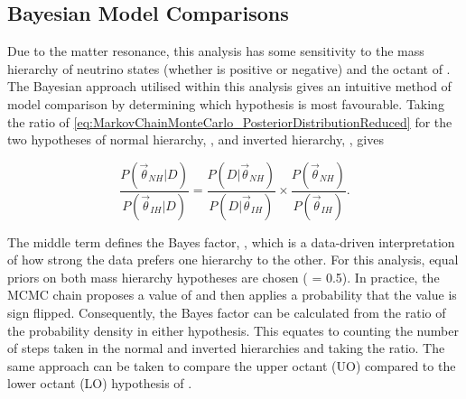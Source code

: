 \subsection{Bayesian Model Comparisons}
\label{sec:MarkovChainMonteCarlo_BayesTheorem}
Due to the matter resonance, this analysis has some sensitivity to the mass hierarchy of neutrino states (whether  is positive or negative) and the octant of . The Bayesian approach utilised within this analysis gives an intuitive method of model comparison by determining which hypothesis is most favourable. Taking the ratio of \autoref{eq:MarkovChainMonteCarlo_PosteriorDistributionReduced} for the two hypotheses of normal hierarchy, , and inverted hierarchy, , gives

\begin{equation}
  \frac{P(\vec{\theta}_{NH}|D)}{P(\vec{\theta}_{IH}|D)} = \frac{P(D|\vec{\theta}_{NH})}{P(D|\vec{\theta}_{IH})} \times \frac{P(\vec{\theta}_{NH})}{P(\vec{\theta}_{IH})}.
\end{equation}

The middle term defines the Bayes factor, , which is a data-driven interpretation of how strong the data prefers one hierarchy to the other. For this analysis, equal priors on both mass hierarchy hypotheses are chosen ( = 0.5). In practice, the MCMC chain proposes a value of  and then applies a  probability that the value is sign flipped. Consequently, the Bayes factor can be calculated from the ratio of the probability density in either hypothesis. This equates to counting the number of steps taken in the normal and inverted hierarchies and taking the ratio. The same approach can be taken to compare the upper octant (UO) compared to the lower octant (LO) hypothesis of .

